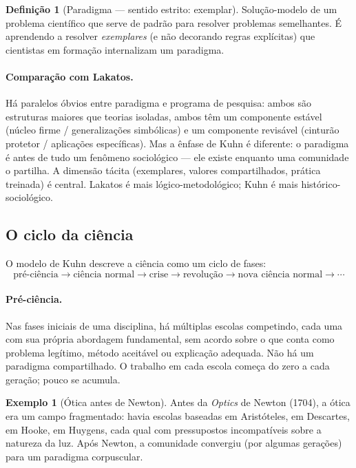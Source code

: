 \documentclass[9pt,a4paper]{extarticle}
\newcommand{\impt}[1]{\textcolor{important}{#1}}
\newcommand{\ntc}[1]{\textcolor{notice}{#1}}
\theoremstyle{definition}
\newtheorem{definition}{Definição}[section]
\newtheorem{example}{Exemplo}[section]
\begin{document}
\begin{definition}[Paradigma --- sentido estrito: exemplar]
Solução-modelo de um problema científico que serve de \impt{padrão} para resolver problemas semelhantes. É aprendendo a resolver \emph{exemplares} (e não decorando regras explícitas) que cientistas em formação internalizam um paradigma.
\end{definition}

\paragraph{Comparação com Lakatos.}
Há paralelos óbvios entre paradigma e programa de pesquisa: ambos são estruturas maiores que teorias isoladas, ambos têm um componente estável (núcleo firme / generalizações simbólicas) e um componente revisável (cinturão protetor / aplicações específicas). Mas \impt{a ênfase de Kuhn é diferente}: o paradigma é antes de tudo um fenômeno \impt{sociológico} --- ele existe enquanto uma comunidade o partilha. A dimensão tácita (exemplares, valores compartilhados, prática treinada) é central. Lakatos é mais lógico-metodológico; Kuhn é mais histórico-sociológico.

\subsection{O ciclo da ciência}

O modelo de Kuhn descreve a ciência como um ciclo de fases:
\[
\text{pré-ciência} \rightarrow \text{ciência normal} \rightarrow \text{crise} \rightarrow \text{revolução} \rightarrow \text{nova ciência normal} \rightarrow \cdots
\]

\paragraph{Pré-ciência.}
Nas fases iniciais de uma disciplina, há \impt{múltiplas escolas} competindo, cada uma com sua própria abordagem fundamental, sem acordo sobre o que conta como problema legítimo, método aceitável ou explicação adequada. \ntc{Não há um paradigma compartilhado.} O trabalho em cada escola começa do zero a cada geração; pouco se acumula.

\begin{example}[Ótica antes de Newton]
Antes da \emph{Optics} de Newton (1704), a ótica era um campo fragmentado: havia escolas baseadas em Aristóteles, em Descartes, em Hooke, em Huygens, cada qual com pressupostos incompatíveis sobre a natureza da luz. Após Newton, a comunidade convergiu (por algumas gerações) para um paradigma corpuscular.
\end{example}
\end{document}
